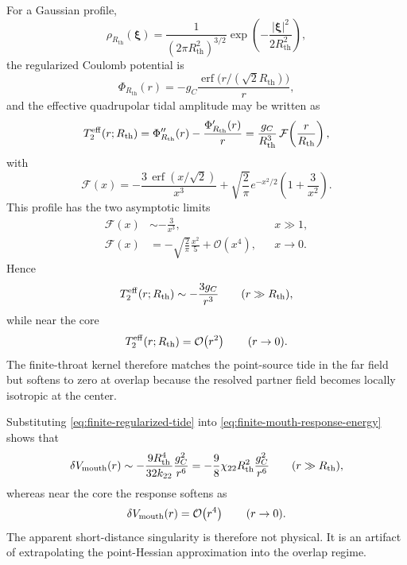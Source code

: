 \documentclass[11pt]{article}
\theoremstyle{plain}
\theoremstyle{definition}
\theoremstyle{remark}
\newcommand{\Rth}{R_{\mathrm{th}}}
\newcommand{\Order}[1]{\mathcal{O}\!\left(#1\right)}
\begin{document}
For a Gaussian profile,
\begin{equation}
\rho_{\Rth}(\boldsymbol\xi)
=
\frac{1}{(2\pi\Rth^2)^{3/2}}
\exp\!\left(-\frac{|\boldsymbol\xi|^2}{2\Rth^2}\right),
\label{eq:finite-gaussian-profile}
\end{equation}
the regularized Coulomb potential is
\begin{equation}
\Phi_{\Rth}(r)
=
-g_C\frac{\operatorname{erf}\!\bigl(r/(\sqrt2\Rth)\bigr)}{r},
\label{eq:finite-regularized-potential}
\end{equation}
and the effective quadrupolar tidal amplitude may be written as
\begin{equation}
T_2^{\rm eff}(r;\Rth)
=
\Phi_{\Rth}''(r)-\frac{\Phi_{\Rth}'(r)}{r}
=
\frac{g_C}{\Rth^3}\,\mathcal F\!\left(\frac{r}{\Rth}\right),
\label{eq:finite-regularized-tide}
\end{equation}
with
\begin{equation}
\mathcal F(x)
=
-\frac{3\,\operatorname{erf}(x/\sqrt2)}{x^3}
+\sqrt{\frac{2}{\pi}}e^{-x^2/2}\left(1+\frac{3}{x^2}\right).
\label{eq:finite-F-function}
\end{equation}
This profile has the two asymptotic limits
\begin{align}
\mathcal F(x)
&\sim -\frac{3}{x^3}, && x\gg 1,
\label{eq:finite-F-large-x}
\\[0.5ex]
\mathcal F(x)
&= -\sqrt{\frac{2}{\pi}}\frac{x^2}{5}+\Order{x^4}, && x\to 0.
\label{eq:finite-F-small-x}
\end{align}
Hence
\begin{equation}
T_2^{\rm eff}(r;\Rth)
\sim -\frac{3g_C}{r^3}
\qquad (r\gg \Rth),
\label{eq:finite-tide-large-r}
\end{equation}
while near the core
\begin{equation}
T_2^{\rm eff}(r;\Rth)=\Order{r^2}
\qquad (r\to 0).
\label{eq:finite-tide-small-r}
\end{equation}
The finite-throat kernel therefore matches the point-source tide in the far field but softens to zero at overlap because the resolved partner field becomes locally isotropic at the center.

Substituting \cref{eq:finite-regularized-tide} into \cref{eq:finite-mouth-response-energy} shows that
\begin{equation}
\delta V_{\rm mouth}(r)
\sim -\frac{9\Rth^4}{32k_{22}}\frac{g_C^2}{r^6}
= -\frac{9}{8}\chi_{22}\Rth^2\frac{g_C^2}{r^6}
\qquad (r\gg \Rth),
\label{eq:finite-mouth-large-r}
\end{equation}
whereas near the core the response softens as
\begin{equation}
\delta V_{\rm mouth}(r)=\Order{r^4}
\qquad (r\to 0).
\label{eq:finite-mouth-small-r}
\end{equation}
The apparent short-distance singularity is therefore not physical. It is an artifact of extrapolating the point-Hessian approximation into the overlap regime.
\end{document}
